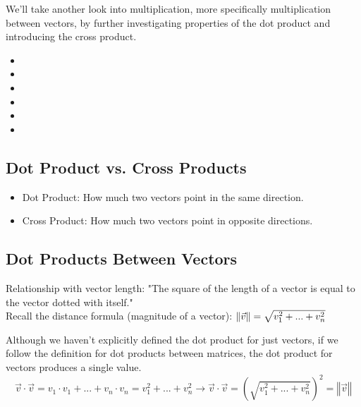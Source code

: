 
We'll take another look into multiplication, more specifically multiplication between vectors, by further investigating properties of the dot product and introducing the cross product.

\begin{itemize}
	\item {}
	\item {}
	\item {}
	\item {}
	\item {}
	\item {}
\end{itemize}


\subsection{Dot Product vs. Cross Products}\label{concept2.1}

\begin{itemize}
	\item Dot Product: How much two vectors point in the same direction.
	\item Cross Product: How much two vectors point in opposite directions.
\end{itemize}


\subsection{Dot Products Between Vectors}\label{concept2.2}
Relationship with vector length: "The square of the length of a vector is equal to the vector dotted with itself."
\\

Recall the distance formula (magnitude of a vector): $\left\Vert \vec{v} \right\Vert = \sqrt{v_{1}^{2} + ... + v_{n}^{2}}$

Although we haven't explicitly defined the dot product for just vectors, if we follow the definition for dot products between matrices, the dot product for vectors produces a single value.
\\
\begin{equation}
	\vec{v} \cdot \vec{v}  = v_1 \cdot v_1 + . . . + v_n \cdot v_n = v_1^2 + . . . + v_n^2
	\longrightarrow
	\vec{v} \cdot \vec{v} = \left(\sqrt{v_1^2 + . . . + v_n^2}\right)^2 = \left\Vert \vec{v} \right\Vert
\end{equation}

